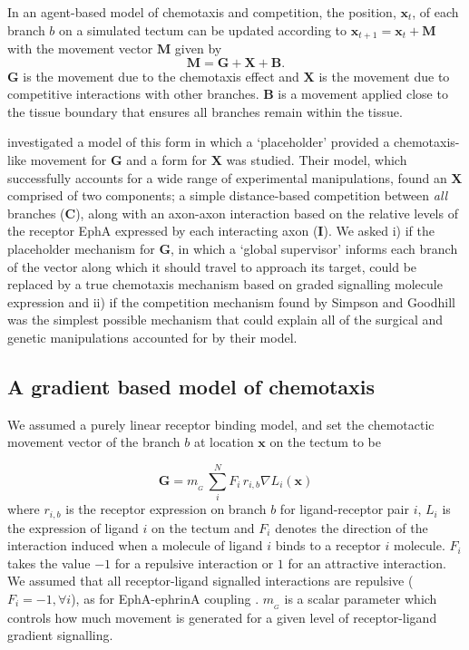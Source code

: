 \documentclass[11pt, a4paper]{article}
\begin{document}
In an agent-based model of chemotaxis and competition, the position, $\mathbf{x}_t$, of each branch $b$ on a simulated tectum can be updated according to $\mathbf{x}_{t+1} = \mathbf{x}_{t} + \mathbf{M}$ with the movement vector $\mathbf{M}$ given by
\begin{equation} \label{e:mv2}
 \mathbf{M} = \mathbf{G} +  \mathbf{X} + \mathbf{B}.
\end{equation}
$\mathbf{G}$ is the movement due to the chemotaxis effect and $\mathbf{X}$ is the movement due to competitive interactions with other branches.
$\mathbf{B}$ is a movement applied close to the tissue boundary that ensures all branches remain within the tissue.

\citet{simpson_simple_2011} investigated a model of this form in which a `placeholder' provided a chemotaxis-like movement for $\mathbf{G}$ and a form for $\mathbf{X}$ was studied.
Their model, which successfully accounts for a wide range of experimental manipulations, found an $\mathbf{X}$ comprised of two components; a simple distance-based competition between \emph{all} branches ($\mathbf{C}$), along with an axon-axon interaction based on the relative levels of the receptor EphA expressed by each interacting axon ($\mathbf{I}$).
We asked i) if the placeholder mechanism for $\mathbf{G}$, in which a `global supervisor' informs each branch of the vector along which it should travel to approach its target, could be replaced by a true chemotaxis mechanism based on graded signalling molecule expression and ii) if the competition mechanism found by Simpson and Goodhill was the simplest possible mechanism that could explain all of the surgical and genetic manipulations accounted for by their model.

\subsection*{A gradient based model of chemotaxis}

We assumed a purely linear receptor binding model, and set the chemotactic movement vector of the branch $b$ at location $\mathbf{x}$ on the tectum to be

\begin{equation}\label{e:G}
\mathbf{G} = m_{\!_G}\,\sum_i^N F_i\,r_{i,b} \nabla L_i(\mathbf{x})
\end{equation}
%
where $r_{i,b}$ is the receptor expression on branch $b$ for ligand-receptor pair $i$, $L_i$ is the expression of ligand $i$ on the tectum and $F_i$ denotes the direction of the interaction induced when a molecule of ligand $i$ binds to a receptor $i$ molecule.
$F_i$ takes the value $-1$ for a repulsive interaction or $1$ for an attractive interaction.
%
We assumed that all receptor-ligand signalled interactions are repulsive ($F_i=-1, \forall i$), as for EphA-ephrinA coupling \citep{drescher_vitro_1995,nakamoto_topographically_1996}.
%
$m_{\!_G}$ is a scalar parameter which controls how much movement is generated for a given level of receptor-ligand gradient signalling.
\end{document}
